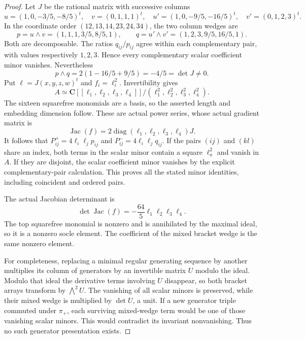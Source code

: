 \begin{proof}
Let $J$ be the rational matrix with successive columns
\[
 u=(1,0,-3/5,-8/5)^t,\quad v=(0,1,1,1)^t,\quad
 u'=(1,0,-9/5,-16/5)^t,\quad v'=(0,1,2,3)^t.
\]
In the coordinate order $(12,13,14,23,24,34)$, the two column wedges are
\[
 p=u\wedge v=(1,1,1,3/5,8/5,1),\qquad
 q=u'\wedge v'=(1,2,3,9/5,16/5,1).
\]
Both are decomposable. The ratios $q_{ij}/p_{ij}$ agree within each
complementary pair, with values respectively $1,2,3$. Hence every
complementary scalar coefficient minor vanishes. Nevertheless
\[
 p\wedge q=2(1-16/5+9/5)=-4/5=\det J\ne0.
\]
Put $\ell=J(x,y,z,w)^t$ and $f_i=\ell_i^2$. Invertibility gives
\[
 A\simeq\mathbf C[[\ell_1,\ell_2,\ell_3,\ell_4]]/
                 (\ell_1^2,\ell_2^2,\ell_3^2,\ell_4^2).
\]
The sixteen squarefree monomials are a basis, so the asserted length
and embedding dimension follow. These are actual power series, whose
actual gradient matrix is
\[
 \operatorname{Jac}(f)=2\operatorname{diag}(\ell_1,\ell_2,\ell_3,\ell_4)J.
\]
It follows that
$P^+_{ij}=4\ell_i\ell_jp_{ij}$ and
$P^-_{ij}=4\ell_i\ell_jq_{ij}$.
If the pairs $(ij)$ and $(kl)$ share an index, both terms in the scalar
minor contain a square $\ell_a^2$ and vanish in $A$.
If they are disjoint, the scalar coefficient minor vanishes by the
explicit complementary-pair calculation. This proves all the stated
minor identities, including coincident and ordered pairs.

The actual Jacobian determinant is
\[
 \det\operatorname{Jac}(f)=-\frac{64}{5}\ell_1\ell_2\ell_3\ell_4.
\]
The top squarefree monomial is nonzero and is annihilated by the maximal
ideal, so it is a nonzero socle element. The coefficient of the mixed
bracket wedge is the same nonzero element.

For completeness, replacing a minimal regular generating sequence by
another multiplies its column of generators by an invertible matrix
$U$ modulo the ideal. Modulo that ideal the derivative terms involving
$U$ disappear, so both bracket arrays transform by $\bigwedge^2U$.
The vanishing of all scalar minors is preserved, while their mixed
wedge is multiplied by $\det U$, a unit. If a new generator triple
commuted under $\pi_+$, each surviving mixed-wedge term would be one
of those vanishing scalar minors. This would contradict its invariant
nonvanishing. Thus no such generator presentation exists.
\end{proof}

